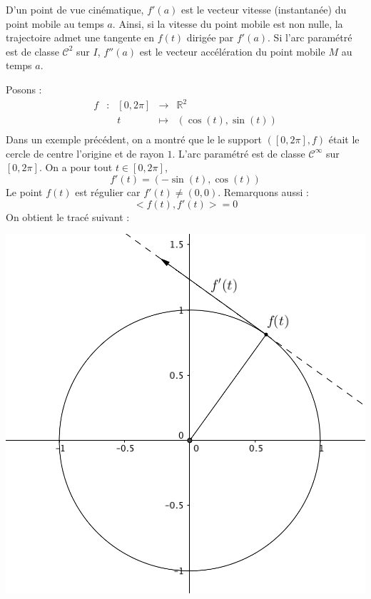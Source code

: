 \documentclass[a4paper,10pt]{report}
\begin{document}
\medskip

\begin{rem}
D'un point de vue cinématique, $f'(a)$ est le vecteur vitesse (instantanée) du point mobile au temps $a$. Ainsi, si la vitesse du point mobile est non nulle, la trajectoire  admet une tangente en $f(t)$ dirigée par $f'(a)$. Si l'arc paramétré est de classe $\mathcal{C}^2$ sur $I$, $f''(a)$ est le vecteur accélération du point mobile $M$ au temps $a$.
\end{rem}

\medskip

\begin{ex} Posons :
$$ \begin{array}{ccccl}
f & : & [0,2 \pi] & \rightarrow & \mathbb{R}^2 \\
 & & t & \mapsto & (\cos(t), \sin(t)) \\
\end{array}$$
Dans un exemple précédent, on a montré que le le support $([0,2\pi],f)$ était le cercle de centre l'origine et de rayon $1$. L'arc paramétré est de classe $\mathcal{C}^{\infty}$ sur $[0,2\pi]$. On a pour tout $t \in [0, 2 \pi]$,
$$ f'(t) = (-\sin(t),\cos(t))$$
Le point $f(t)$ est régulier car $f'(t) \neq (0,0)$. Remarquons aussi :
$$ <f(t),f'(t)> = 0$$
On obtient le tracé suivant :

\begin{center}
\includegraphics[scale=0.4]{cercle}
\end{center}
\end{ex}
\end{document}
